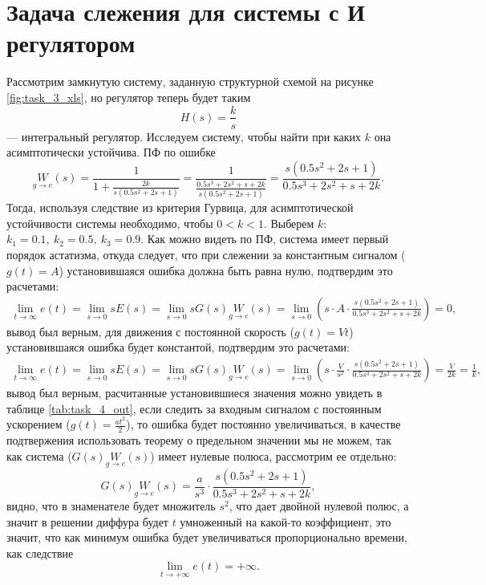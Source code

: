 \section{Задача слежения для системы с И регулятором}

Рассмотрим замкнутую систему, заданную структурной схемой на рисунке \ref{fig:task_3_xls},
но регулятор теперь будет таким
\begin{equation*}
    H(s)=\frac{k}{s}
\end{equation*}
--- интегральный регулятор. Исследуем систему, чтобы найти при каких $k$ она асимптотически
устойчива. ПФ по ошибке
\begin{equation*}
    \underset{g\rightarrow e}{W}(s)=\frac{1}{1+\frac{2k}{s(0.5s^2+2s+1)}}=\frac{1}{\frac{0.5s^3+2s^2+s+2k}{s(0.5s^2+2s+1)}}=\frac{s(0.5s^2+2s+1)}{0.5s^3+2s^2+s+2k}.
\end{equation*}
Тогда, используя следствие из критерия Гурвица, для асимптотической устойчивости системы
необходимо, чтобы $0<k<1$. Выберем $k$: $k_1=0.1,\ k_2=0.5,\ k_3=0.9$.
Как можно видеть по ПФ, система имеет первый порядок астатизма, откуда следует, что при слежении за
константным сигналом ($g(t)=A$) установившаяся ошибка должна быть равна нулю, подтвердим это расчетами:
\begin{multline*}
    \lim_{t\rightarrow\infty}e(t)
    =\lim_{s\rightarrow0}sE(s)
    =\lim_{s\rightarrow0}sG(s)\underset{g\rightarrow e}{W}(s)
    =\lim_{s\rightarrow0}\left(s\cdot A\cdot\frac{s(0.5s^2+2s+1)}{0.5s^3+2s^2+s+2k}\right)
    =0,
\end{multline*}
вывод был верным, для движения с постоянной 
скорость ($g(t)=Vt$) установившаяся ошибка будет константой, подтвердим это расчетами:
\begin{multline*}
    \lim_{t\rightarrow\infty}e(t)
    =\lim_{s\rightarrow0}sE(s)
    =\lim_{s\rightarrow0}sG(s)\underset{g\rightarrow e}{W}(s)
    =\lim_{s\rightarrow0}\left(s\cdot\frac{V}{s^2}\cdot\frac{s(0.5s^2+2s+1)}{0.5s^3+2s^2+s+2k}\right)
    =\frac{V}{2k}=\frac{1}{k},
\end{multline*}
вывод был верным, расчитанные установившиеся значения можно увидеть в таблице \ref{tab:task_4_out},
если следить за входным сигналом с 
постоянным ускорением ($g(t)=\frac{at^2}{2}$), то ошибка будет постоянно увеличиваться, в качестве подтвержения
использовать теорему о предельном значении мы не можем, так как система ($G(s)\underset{g\rightarrow e}{W}(s)$)
имеет нулевые полюса, рассмотрим ее отдельно:
\begin{equation*}
    G(s)\underset{g\rightarrow e}{W}(s)
    =\frac{a}{s^3}\cdot\frac{s(0.5s^2+2s+1)}{0.5s^3+2s^2+s+2k},
\end{equation*}
видно, что в знаменателе будет множитель $s^2$, что дает двойной нулевой полюс, а
значит в решении диффура будет $t$ умноженный на какой-то коэффициент, это значит, что как минимум
ошибка будет увеличиваться пропорционально времени, как следствие
\begin{equation*}
    \lim\limits_{t\to+\infty}e(t)=+\infty.
\end{equation*}

